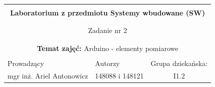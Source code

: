\documentclass[polish,a4paper]{article}
\begin{document}
	\begin{center}
		\begin{tabular}{ p{} p{} p{} p{} p{} }
			
			&   &   &   &  \\
			\hline
			\multicolumn{5}{|c|}{}\\[-1ex]
			\multicolumn{5}{|c|}{{\LARGE \textbf{Laboratorium z przedmiotu Systemy wbudowane (SW)}}}\\
			\multicolumn{5}{|c|}{}\\[-1ex]
			\hline
			\hline
			
			\multicolumn{5}{|c|}{}\\[-1ex]
			\multicolumn{5}{|c|}{{\LARGE Zadanie nr 2}}\\
			\multicolumn{5}{|c|}{}\\[-1ex]
			\hline
			\hline
			
			\multicolumn{5}{|c|}{}\\[-1ex]
			\multicolumn{5}{|c|}{{\textbf{Temat zajęć:} Arduino - elementy pomiarowe}}\\
			\multicolumn{5}{|c|}{}\\[-1ex]
			\hline
			\hline
			
			\multicolumn{1}{|l|}{Prowadzący} &
			\multicolumn{2}{|l|}{Autorzy} &
			\multicolumn{2}{|l|}{Grupa dziekańska:} \\
			\multicolumn{1}{|c|}{mgr inż. Ariel Antonowicz} &
			\multicolumn{2}{|c|}{148088 i 148121} &
			\multicolumn{2}{|c|}{I1.2} \\
			\hline
			\hline
		\end{tabular}
	\end{center}
	\[\]
\end{document}
